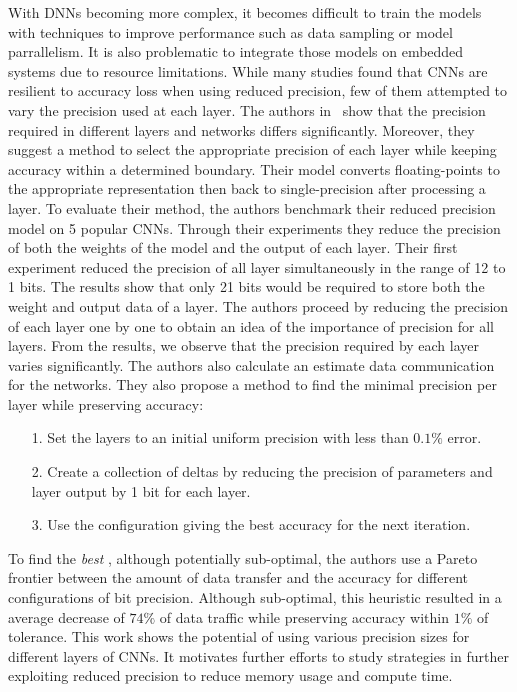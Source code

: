 With DNNs becoming more complex, it becomes difficult to train the models with 
techniques to improve performance such as data sampling or model parrallelism.
It is also problematic to integrate those models on embedded systems due to resource limitations.
While many studies found that CNNs are resilient to accuracy loss when using reduced precision,
few of them attempted to vary the precision used at each layer.
The authors in~\cite{Judd2015-kw} show that the precision required in different layers and networks
differs significantly.
Moreover, they suggest a method to select the appropriate precision of each layer while 
keeping accuracy within a determined boundary.
Their model converts floating-points to the appropriate representation then back to single-precision after processing a layer.
To evaluate their method, the authors benchmark their reduced precision model on 5 popular CNNs.
Through their experiments they reduce the precision of both the weights of the model and the output of each layer.
Their first experiment reduced the precision of all layer simultaneously in the range of 12 to 1 bits.
The results show that only 21 bits would be required to store both the weight and output data of a layer.
The authors proceed by reducing the precision of each layer one by one to obtain an idea of the importance of precision for all layers.
From the results, we observe that the precision required by each layer varies significantly.
The authors also calculate an estimate data communication for the networks.
They also propose a method to find the minimal precision per layer while preserving accuracy:
\begin{itemize}
	\item[1.] Set the layers to an initial uniform precision with less than $0.1\%$ error.
	\item[2.] Create a collection of deltas by reducing the precision of parameters and layer output by 1 bit for each layer.
	\item[3.] Use the configuration giving the best accuracy for the next iteration.
\end{itemize}
To find the \textit{best} , although potentially sub-optimal, the authors use a Pareto
frontier between the amount of data transfer and the accuracy for different configurations of bit precision.
Although sub-optimal, this heuristic resulted in a average decrease of $74\%$ of data traffic
while preserving accuracy within $1\%$ of tolerance.
This work shows the potential of using various precision sizes for different layers of CNNs.
It motivates further efforts to study strategies in further exploiting reduced precision
to reduce memory usage and compute time. 

